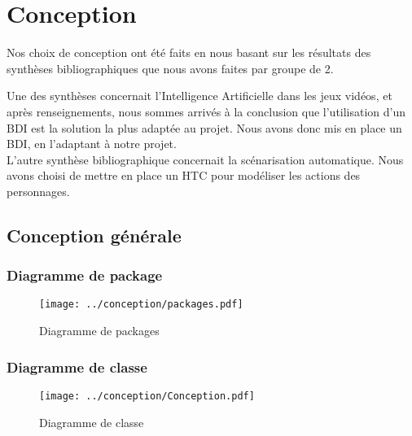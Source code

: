\documentclass[asi]{picINSA}
\begin{document}
\chapter{Conception}
Nos choix de conception ont été faits en nous basant sur les résultats des synthèses bibliographiques que nous avons faites par groupe de 2. \newline

Une des synthèses concernait l'Intelligence Artificielle dans les jeux vidéos, et après renseignements, nous sommes arrivés à la conclusion que l'utilisation d'un BDI est la solution la plus adaptée au projet. Nous avons donc mis en place un BDI, en l'adaptant à notre projet. \\

L'autre synthèse bibliographique concernait la scénarisation automatique. Nous avons choisi de mettre en place un HTC pour modéliser les actions des personnages. \\

\section{Conception générale}

\subsection{Diagramme de package}
\begin{figure}[!ht]
  \begin{center}
    \texttt{[image: ../conception/packages.pdf]}
    \caption{Diagramme de packages}	
  \end{center}
\end{figure}



\subsection{Diagramme de classe}
\begin{figure}[!ht]
  \begin{center}
    \texttt{[image: ../conception/Conception.pdf]}
    \caption{Diagramme de classe}	
  \end{center}
\end{figure}






  
\end{document}
